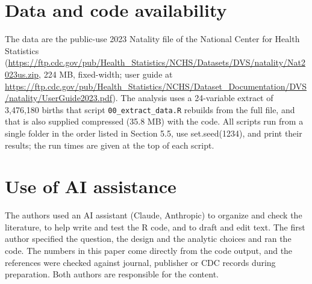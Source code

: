\documentclass[11pt,letterpaper]{article}
\begin{document}
\section*{Data and code availability}

The data are the public-use 2023 Natality file of the National Center for Health Statistics (\url{https://ftp.cdc.gov/pub/Health_Statistics/NCHS/Datasets/DVS/natality/Nat2023us.zip}, 224 MB, fixed-width; user guide at \url{https://ftp.cdc.gov/pub/Health_Statistics/NCHS/Dataset_Documentation/DVS/natality/UserGuide2023.pdf}). The analysis uses a 24-variable extract of 3,476,180 births that script \texttt{00\_extract\_data.R} rebuilds from the full file, and that is also supplied compressed (35.8 MB) with the code. All scripts run from a single folder in the order listed in Section 5.5, use set.seed(1234), and print their results; the run times are given at the top of each script.

\section*{Use of AI assistance}

The authors used an AI assistant (Claude, Anthropic) to organize and check the literature, to help write and test the R code, and to draft and edit text. The first author specified the question, the design and the analytic choices and ran the code. The numbers in this paper come directly from the code output, and the references were checked against journal, publisher or CDC records during preparation. Both authors are responsible for the content.
\end{document}
